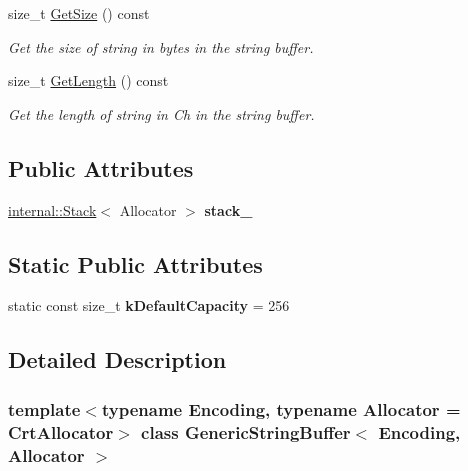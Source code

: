 \begin{DoxyCompactItemize}
size\+\_\+t \hyperlink{a02208_a725e862b9a78375f5363b0b61ad789f3}{Get\+Size} () const
\begin{DoxyCompactList}\small\item\em Get the size of string in bytes in the string buffer. \end{DoxyCompactList}\item 
\mbox{\label{a02208_ad324b8154be3354dda3aa4a0a7361499}} 
size\+\_\+t \hyperlink{a02208_ad324b8154be3354dda3aa4a0a7361499}{Get\+Length} () const
\begin{DoxyCompactList}\small\item\em Get the length of string in Ch in the string buffer. \end{DoxyCompactList}\end{DoxyCompactItemize}
\subsection*{Public Attributes}
\begin{DoxyCompactItemize}
\item 
\mbox{\label{a02208_aaef716643febb9de5957dbf8ff904409}} 
\hyperlink{a02288}{internal\+::\+Stack}$<$ Allocator $>$ {\bfseries stack\+\_\+}
\end{DoxyCompactItemize}
\subsection*{Static Public Attributes}
\begin{DoxyCompactItemize}
\item 
\mbox{\label{a02208_ae74f9df854dd5a7db4315ef44b016d22}} 
static const size\+\_\+t {\bfseries k\+Default\+Capacity} = 256
\end{DoxyCompactItemize}


\subsection{Detailed Description}
\subsubsection*{template$<$typename Encoding, typename Allocator = Crt\+Allocator$>$\newline
class Generic\+String\+Buffer$<$ Encoding, Allocator $>$}

